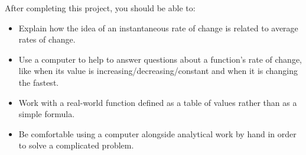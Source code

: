 After completing this project, you should be able to:
\begin{itemize}
	\item Explain how the idea of an instantaneous rate of change is related to average rates of change.
	\item Use a computer to help to answer questions about a function's rate of change, like when its value is increasing/decreasing/constant and when it is changing the fastest.
	\item Work with a real-world function defined as a table of values rather than as a simple formula.
	\item Be comfortable using a computer alongside analytical work by hand in order to solve a complicated problem.
\end{itemize}





